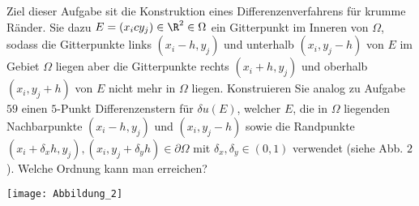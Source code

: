 \begin{exercise}
  Ziel dieser Aufgabe sit die Konstruktion eines Differenzenverfahrens für krumme
  Ränder. Sie dazu $E =(x_ic y_j) \in \R^2 \in \Omega$ ein Gitterpunkt im Inneren
  von $\Omega$, sodass die Gitterpunkte links $(x_i -h, y_j)$ und unterhalb
  $(x_i,y_j -h)$ von $E$ im Gebiet $\Omega$ liegen aber die Gitterpunkte rechts
  $(x_i + h, y_j)$ und oberhalb $(x_i, y_j + h)$ von $E$ nicht mehr in $\Omega$ liegen.
  Konstruieren Sie analog zu Aufgabe $59$ einen $5$-Punkt Differenzenstern für
  $\delta u(E)$, welcher $E$, die in $\Omega$ liegenden Nachbarpunkte $(x_i -h, y_j)$
  und $(x_i, y_j -h)$ sowie die Randpunkte
  $(x_i + \delta_x h , y_j), (x_i, y_j + \delta_y h) \in \partial \Omega$ mit
  $\delta_x, \delta_y \in (0,1)$ verwendet (siehe Abb. $2$). Welche Ordnung kann man
  erreichen?

  \texttt{[image: Abbildung\_2]}
\end{exercise}

